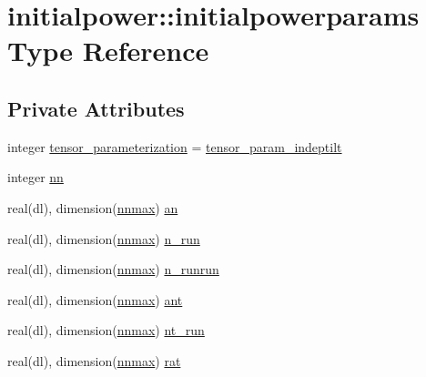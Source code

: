 \hypertarget{structinitialpower_1_1initialpowerparams}{}\section{initialpower\+:\+:initialpowerparams Type Reference}
\label{structinitialpower_1_1initialpowerparams}
\subsection*{Private Attributes}
\begin{DoxyCompactItemize}
\item 
integer \mbox{\hyperlink{structinitialpower_1_1initialpowerparams_a8b40fb8380a1b6d7cf9b1cf75484a7ab}{tensor\+\_\+parameterization}} = \mbox{\hyperlink{namespaceinitialpower_a08c3c750bc5c8657967d99b3f0b9585e}{tensor\+\_\+param\+\_\+indeptilt}}
\item 
integer \mbox{\hyperlink{structinitialpower_1_1initialpowerparams_a38e54c4a70343ebb934d8f2182cf828b}{nn}}
\item 
real(dl), dimension(\mbox{\hyperlink{namespaceinitialpower_a9749c023ff83f7ffa2677dc578379c10}{nnmax}}) \mbox{\hyperlink{structinitialpower_1_1initialpowerparams_ab9f0c6dad5a3371d714344d07b383999}{an}}
\item 
real(dl), dimension(\mbox{\hyperlink{namespaceinitialpower_a9749c023ff83f7ffa2677dc578379c10}{nnmax}}) \mbox{\hyperlink{structinitialpower_1_1initialpowerparams_a957a8e3782c9514a4113c24fc60f535a}{n\+\_\+run}}
\item 
real(dl), dimension(\mbox{\hyperlink{namespaceinitialpower_a9749c023ff83f7ffa2677dc578379c10}{nnmax}}) \mbox{\hyperlink{structinitialpower_1_1initialpowerparams_a1d81f8888e73fb511ef361c02304cab7}{n\+\_\+runrun}}
\item 
real(dl), dimension(\mbox{\hyperlink{namespaceinitialpower_a9749c023ff83f7ffa2677dc578379c10}{nnmax}}) \mbox{\hyperlink{structinitialpower_1_1initialpowerparams_a1f6bbba14b2a96e869ac7c7c054c0b12}{ant}}
\item 
real(dl), dimension(\mbox{\hyperlink{namespaceinitialpower_a9749c023ff83f7ffa2677dc578379c10}{nnmax}}) \mbox{\hyperlink{structinitialpower_1_1initialpowerparams_a90b48d9ec3ea67b8a09db4a4f6776f23}{nt\+\_\+run}}
\item 
real(dl), dimension(\mbox{\hyperlink{namespaceinitialpower_a9749c023ff83f7ffa2677dc578379c10}{nnmax}}) \mbox{\hyperlink{structinitialpower_1_1initialpowerparams_ab843424ddb82e7fc279f7dc777b178ec}{rat}}

\end{DoxyCompactItemize}
